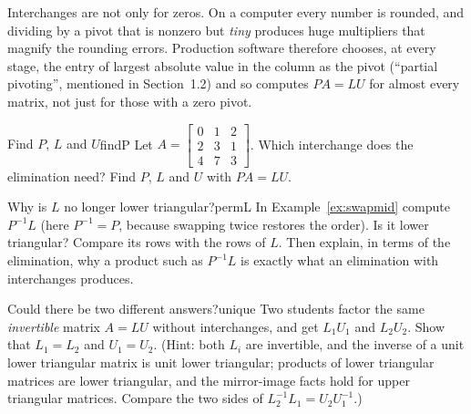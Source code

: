 \documentclass[11pt]{article}
\begin{document}
\begin{warn}
Interchanges are not only for zeros. On a computer every number is rounded, and dividing by a pivot that is nonzero but \emph{tiny} produces huge multipliers that magnify the rounding errors. Production software therefore chooses, at every stage, the entry of largest absolute value in the column as the pivot (``partial pivoting'', mentioned in Section~1.2) and so computes $PA=LU$ for almost every matrix, not just for those with a zero pivot.
\end{warn}

\begin{kc}{Find $P$, $L$ and $U$}{findP}
Let $A=\begin{bmatrix}0&1&2\\2&3&1\\4&7&3\end{bmatrix}$. Which interchange does the elimination need? Find $P$, $L$ and $U$ with $PA=LU$.
\end{kc}

\begin{think}{Why is $L$ no longer lower triangular?}{permL}
In Example~\ref{ex:swapmid} compute $P^{-1}L$ (here $P^{-1}=P$, because swapping twice restores the order). Is it lower triangular? Compare its rows with the rows of $L$. Then explain, in terms of the elimination, why a product such as $P^{-1}L$ is exactly what an elimination with interchanges produces.
\end{think}

\begin{think}{Could there be two different answers?}{unique}
Two students factor the same \emph{invertible} matrix $A=LU$ without interchanges, and get $L_1U_1$ and $L_2U_2$. Show that $L_1=L_2$ and $U_1=U_2$. (Hint: both $L_i$ are invertible, and the inverse of a unit lower triangular matrix is unit lower triangular; products of lower triangular matrices are lower triangular, and the mirror-image facts hold for upper triangular matrices. Compare the two sides of $L_2^{-1}L_1=U_2U_1^{-1}$.)
\end{think}
\end{document}
